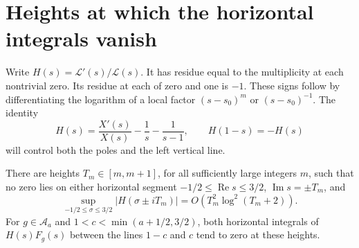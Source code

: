\documentclass[11pt]{article}
\numberwithin{equation}{section}
\newcommand{\A}{\mathcal A}
\begin{document}
\section{Heights at which the horizontal integrals vanish}
\label{sec:heights}

Write $H(s)=\mathcal L'(s)/\mathcal L(s)$.
It has residue equal to the multiplicity at each nontrivial zero.
Its residue at each of zero and one is $-1$.
These signs follow by differentiating the logarithm of a local factor
$(s-s_0)^m$ or $(s-s_0)^{-1}$.
The identity
\begin{equation}
 H(s)=\frac{X'(s)}{X(s)}-\frac1s-\frac1{s-1},
 \qquad H(1-s)=-H(s)
 \label{eq:log-reflection}
\end{equation}
will control both the poles and the left vertical line.

\begin{lemma}
There are heights\label{lem:heights} $T_m\in[m,m+1]$, for all sufficiently large integers $m$,
such that no zero lies on either horizontal segment
$-1/2\leq\operatorname{Re}s\leq3/2$, $\operatorname{Im}s=\pm T_m$,
and
\begin{equation}
 \sup_{-1/2\leq\sigma\leq3/2}|H(\sigma\pm iT_m)|
       =O(T_m^2\log^2(T_m+2)).
 \label{eq:horizontal-H}
\end{equation}
For $g\in\A_a$ and $1<c<\min(a+1/2,3/2)$, both horizontal integrals
of $H(s)F_g(s)$ between the lines $1-c$ and $c$ tend to zero at these heights.
\end{lemma}
\end{document}
